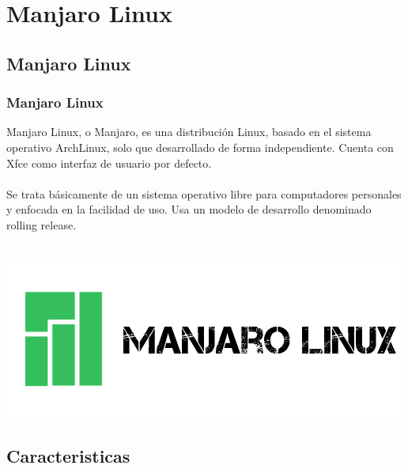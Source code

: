 \documentclass[9pt,t]{beamer}
\begin{document}
\section{Manjaro Linux}

\subsection{Manjaro Linux}
\begin{frame}\justifying
  \frametitle{Manjaro Linux}
	Manjaro Linux, o Manjaro, es una distribución Linux, basado en el sistema operativo ArchLinux, 
	solo que desarrollado de forma independiente.
	Cuenta con Xfce como interfaz de usuario por defecto. \ \\ \ \\
	Se trata básicamente de un sistema operativo libre para computadores personales y 
	enfocada en la facilidad de uso. Usa un modelo de desarrollo denominado rolling release.
    \ \\ \ \\
    \begin{center}
      \includegraphics[height=0.20\textheight]{images/02_logo_text_black.png} \hspace*{0.0cm}
    \end{center}
\end{frame}


\subsection{Caracteristicas}
\end{document}
